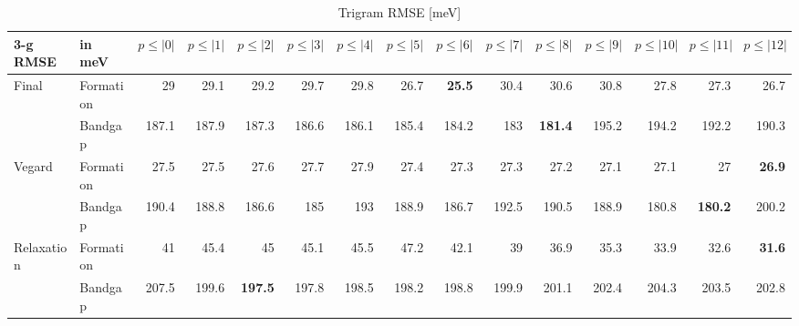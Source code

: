 \documentclass[11pt,oneside,czech,american]{book} %
\theoremstyle{definition} %
\theoremstyle{definition}
\begin{document}
\begin{table}[H]
	\scriptsize
	\centering
\begin{tabular}{llrrrrrrrrrrrrr}
	\hline
	3-g RMSE   & in meV    &   $p{\leq}|0|$ &   $p{\leq}|1|$ &   $p{\leq}|2|$ &   $p{\leq}|3|$ &   $p{\leq}|4|$ &   $p{\leq}|5|$ &   $p{\leq}|6|$ &   $p{\leq}|7|$ &   $p{\leq}|8|$ &   $p{\leq}|9|$ &   $p{\leq}|10|$ &   $p{\leq}|11|$ &   $p{\leq}|12|$ \\
	\hline
	\multirow{2}{*}{Final}      & Formation &       29   &       29.1 &       29.2 &       29.7 &       29.8 &       26.7 &       \textbf{25.5} &       30.4 &       30.6 &       30.8 &        27.8 &        27.3 &        26.7\\
	      & Bandgap   &      187.1 &      187.9 &      187.3 &      186.6 &      186.1 &      185.4 &      184.2 &      183   &      \textbf{181.4} &      195.2 &       194.2 &       192.2 &       190.3\\
	\multirow{2}{*}{Vegard}     & Formation &       27.5 &       27.5 &       27.6 &       27.7 &       27.9 &       27.4 &       27.3 &       27.3 &       27.2 &       27.1 &        27.1 &        27   &        \textbf{26.9}\\
	     & Bandgap   &      190.4 &      188.8 &      186.6 &      185   &      193   &      188.9 &      186.7 &      192.5 &      190.5 &      188.9 &       180.8 &       \textbf{180.2} &       200.2\\
	\multirow{2}{*}{Relaxation} & Formation &       41   &       45.4 &       45   &       45.1 &       45.5 &       47.2 &       42.1 &       39   &       36.9 &       35.3 &        33.9 &        32.6 &        \textbf{31.6}\\
	 & Bandgap   &      207.5 &      199.6 &      \textbf{197.5} &      197.8 &      198.5 &      198.2 &      198.8 &      199.9 &      201.1 &      202.4 &       204.3 &       203.5 &       202.8\\
	\hline
\end{tabular}
	\caption{Trigram RMSE [meV]}
	\label{3-g RMSE}
\end{table}
\end{document}
